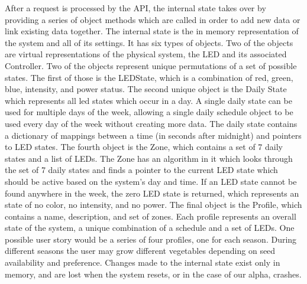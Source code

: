 \documentclass[onecolumn, draftclsnofoot,10pt, compsoc]{IEEEtran}
\begin{document}
	\noindent After a request is processed by the API, the internal state takes over by providing a series of object methods which are called in order to add new data or link existing data together.
	The internal state is the in memory representation of the system and all of its settings.
	It has six types of objects. Two of the objects are virtual representations of the physical system, the LED and its associated Controller.
	Two of the objects represent unique permutations of a set of possible states. The first of those is the LEDState, which is a combination of red, green, blue, intensity, and power status.
	The second unique object is the Daily State which represents all led states which occur in a day.
	A single daily state can be used for multiple days of the week, allowing a single daily schedule object to be used every day of the week without creating more data.
	The daily state contains a dictionary of mappings between a time (in seconds after midnight) and pointers to LED states.
	The fourth object is the Zone, which contains a set of 7 daily states and a list of LEDs.
	The Zone has an algorithm in it which looks through the set of 7 daily states and finds a pointer to the current LED state which should be active based on the system's day and time.
	If an LED state cannot be found anywhere in the week, the zero LED state is returned, which represents an state of no color, no intensity, and no power.
	The final object is the Profile, which contains a name, description, and set of zones.
	Each profile represents an overall state of the system, a unique combination of a schedule and a set of LEDs.
	One possible user story would be a series of four profiles, one for each season.
	During different seasons the user may grow different vegetables depending on seed availability and preference. Changes made to the internal state exist only in memory, and are lost when the system resets, or in the case of our alpha, crashes.
\end{document}
